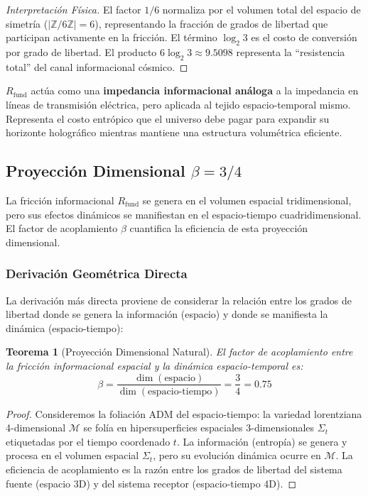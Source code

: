 \documentclass[11pt, a4paper]{article}
\theoremstyle{plain}
\newtheorem{teorema}{Teorema}[section]
\theoremstyle{definition}
\newcommand{\Zmod}{\mathbb{Z}/6\mathbb{Z}}
\newcommand{\Rfactor}{R_{\text{fund}}}
\begin{document}
\begin{proof}[Interpretación Física]
El factor $1/6$ normaliza por el volumen total del espacio de simetría ($|\Zmod| = 6$), representando la fracción de grados de libertad que participan activamente en la fricción. El término $\log_2 3$ es el costo de conversión por grado de libertad. El producto $6\log_2 3 \approx 9.5098$ representa la ``resistencia total'' del canal informacional cósmico.
\end{proof}

$\Rfactor$ actúa como una \textbf{impedancia informacional análoga} a la impedancia en líneas de transmisión eléctrica, pero aplicada al tejido espacio-temporal mismo. Representa el costo entrópico que el universo debe pagar para expandir su horizonte holográfico mientras mantiene una estructura volumétrica eficiente.

\subsection{Proyección Dimensional \texorpdfstring{$\beta = 3/4$}{β=3/4}}

La fricción informacional $\Rfactor$ se genera en el volumen espacial tridimensional, pero sus efectos dinámicos se manifiestan en el espacio-tiempo cuadridimensional. El factor de acoplamiento $\beta$ cuantifica la eficiencia de esta proyección dimensional.

\subsubsection{Derivación Geométrica Directa}

La derivación más directa proviene de considerar la relación entre los grados de libertad donde se genera la información (espacio) y donde se manifiesta la dinámica (espacio-tiempo):

\begin{teorema}[Proyección Dimensional Natural]
El factor de acoplamiento entre la fricción informacional espacial y la dinámica espacio-temporal es:
\begin{equation}
\boxed{\beta = \frac{\dim(\text{espacio})}{\dim(\text{espacio-tiempo})} = \frac{3}{4} = 0.75}
\label{eq:beta_derivation}
\end{equation}
\end{teorema}

\begin{proof}
Consideremos la foliación ADM del espacio-tiempo: la variedad lorentziana 4-dimensional $\mathcal{M}$ se folía en hipersuperficies espaciales 3-dimensionales $\Sigma_t$ etiquetadas por el tiempo coordenado $t$. La información (entropía) se genera y procesa en el volumen espacial $\Sigma_t$, pero su evolución dinámica ocurre en $\mathcal{M}$. La eficiencia de acoplamiento es la razón entre los grados de libertad del sistema fuente (espacio 3D) y del sistema receptor (espacio-tiempo 4D).
\end{proof}
\end{document}
